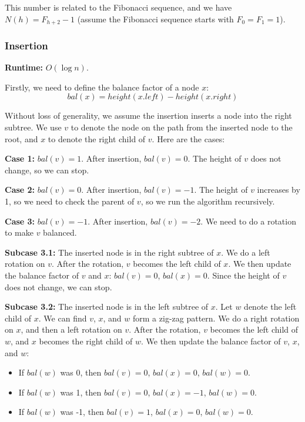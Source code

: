 \documentclass[a4paper,12pt]{article}
\begin{document}
This number is related to the Fibonacci sequence, and we have $N(h) = F_{h + 2} - 1$ (assume the Fibonacci sequence starts with $F_0 = F_1 = 1$).

\subsubsection{Insertion}

\textbf{Runtime:}
$O(\log n)$.

Firstly, we need to define the balance factor of a node $x$:
\begin{equation*}
	bal(x) = height(x.left) - height(x.right)
\end{equation*}

Without loss of generality, we assume the insertion inserts a node into the right subtree.
We use $v$ to denote the node on the path from the inserted node to the root, and $x$ to denote the right child of $v$.
Here are the cases:

\textbf{Case 1:} 
$bal(v) = 1$.
After insertion, $bal(v) = 0$.
The height of $v$ does not change, so we can stop.

\textbf{Case 2:}
$bal(v) = 0$.
After insertion, $bal(v) = -1$.
The height of $v$ increases by 1, so we need to check the parent of $v$, so we run the algorithm recursively.

\textbf{Case 3:}
$bal(v) = -1$.
After insertion, $bal(v) = -2$.
We need to do a rotation to make $v$ balanced.

\textbf{Subcase 3.1:}
The inserted node is in the right subtree of $x$.
We do a left rotation on $v$.
After the rotation, $v$ becomes the left child of $x$.
We then update the balance factor of $v$ and $x$: $bal(v) = 0$, $bal(x) = 0$.
Since the height of $v$ does not change, we can stop.

\textbf{Subcase 3.2:}
The inserted node is in the left subtree of $x$.
Let $w$ denote the left child of $x$.
We can find $v$, $x$, and $w$ form a zig-zag pattern.
We do a right rotation on $x$, and then a left rotation on $v$.
After the rotation, $v$ becomes the left child of $w$, and $x$ becomes the right child of $w$.
We then update the balance factor of $v$, $x$, and $w$:
\begin{itemize}
	\item If $bal(w)$ was 0, then $bal(v) = 0$, $bal(x) = 0$, $bal(w) = 0$.
	\item If $bal(w)$ was 1, then $bal(v) = 0$, $bal(x) = -1$, $bal(w) = 0$.
	\item If $bal(w)$ was -1, then $bal(v) = 1$, $bal(x) = 0$, $bal(w) = 0$.
\end{itemize}
\end{document}
